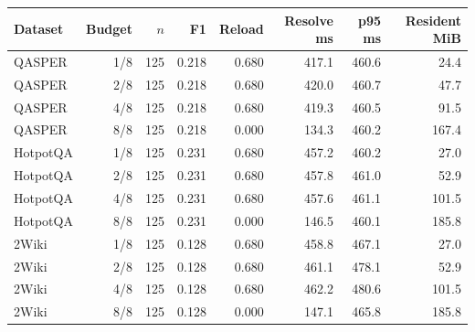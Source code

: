 \begin{tabular}{lrrrrrrr}
\toprule
Dataset & Budget & $n$ & F1 & Reload & Resolve ms & p95 ms & Resident MiB \\
\midrule
QASPER & 1/8 & 125 & 0.218 & 0.680 & 417.1 & 460.6 & 24.4 \\
QASPER & 2/8 & 125 & 0.218 & 0.680 & 420.0 & 460.7 & 47.7 \\
QASPER & 4/8 & 125 & 0.218 & 0.680 & 419.3 & 460.5 & 91.5 \\
QASPER & 8/8 & 125 & 0.218 & 0.000 & 134.3 & 460.2 & 167.4 \\
HotpotQA & 1/8 & 125 & 0.231 & 0.680 & 457.2 & 460.2 & 27.0 \\
HotpotQA & 2/8 & 125 & 0.231 & 0.680 & 457.8 & 461.0 & 52.9 \\
HotpotQA & 4/8 & 125 & 0.231 & 0.680 & 457.6 & 461.1 & 101.5 \\
HotpotQA & 8/8 & 125 & 0.231 & 0.000 & 146.5 & 460.1 & 185.8 \\
2Wiki & 1/8 & 125 & 0.128 & 0.680 & 458.8 & 467.1 & 27.0 \\
2Wiki & 2/8 & 125 & 0.128 & 0.680 & 461.1 & 478.1 & 52.9 \\
2Wiki & 4/8 & 125 & 0.128 & 0.680 & 462.2 & 480.6 & 101.5 \\
2Wiki & 8/8 & 125 & 0.128 & 0.000 & 147.1 & 465.8 & 185.8 \\
\bottomrule
\end{tabular}

